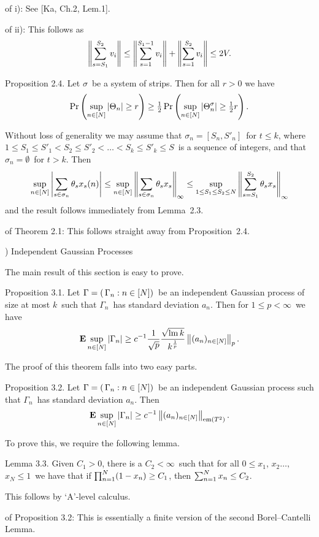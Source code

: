 \proof of i): See [Ka, Ch.2, Lem.1].
\endproof
 
\proof of ii): This follows as
$$ \left\|\sum_{s=S_1}^{S_2}v_i\right\|
\le \left\|\sum_{s=1}^{S_1-1}v_i\right\|
+ \left\|\sum_{s=1}^{S_2}v_i\right\|
\le 2V. $$
\endproof
 
\proclaim Proposition 2.4. Let $\sigma$\ be a system of strips. Then
for all $r>0$ we have
$$ \mathop{\rm Pr}\nolimits\left(\sup_{n\in[N]} \left| \Theta_n \right|\ge r\right)
   \ge {\textstyle {1\over2}}
   \mathop{\rm Pr}\nolimits\left(\sup_{n\in[N]} | \Theta^\sigma_n | \ge{\textstyle {1\over2}} r\right).$$
 
\Proof
Without loss of generality we may assume that
$ \sigma_n = [S_n,S'_n] $\ for $t\le k$,
where
$1\le S_1\le S'_1<S_2\le S'_2 <\ldots<S_k\le S'_k\le S $\
is a sequence of integers, and that $\sigma_n=\emptyset$\ for $t>k$.
Then
$$\sup_{n\in[N]}\left|\sum_{s\in\sigma_n}
\theta_s x_s(n)\right|
 \le \sup_{n\in[N]}\left\|\sum_{s\in\sigma_n} \theta_s x_s
\right\|_\infty
 \le \sup_{1\le S_1\le S_2\le N} \left\|\sum_{s=S_1}^{S_2}
\theta_s x_s \right\|_\infty $$
and the result follows immediately from Lemma~2.3.
\endproof
 
\bigskip
 
\proof of Theorem 2.1: This follows straight away from Proposition~2.4.
\endproof
 
\vfill
\eject
 
) Independent Gaussian Processes
 
The main result of this section is easy to prove.
 
\proclaim Proposition 3.1. Let $\Gamma=(\,\Gamma_n:n\in[N])$\ be an independent
Gaussian process of size at most $k$\ such that $\Gamma_n$\ has
standard deviation $a_n$. Then for $1\le p<\infty$\ we have
$$ {\bf E} \sup_{n\in[N]} | \Gamma_n | \ge c^{-1} {1\over\sqrt{p}} {\sqrt{\mathop{\rm lm}\nolimits k} \over k^{1\over p}}
   \left\| (a_n)_{n\in[N]} \right\|_p .$$
 
The proof of this theorem falls into two easy parts.
 
\proclaim Proposition 3.2. Let $\Gamma=(\,\Gamma_n:n\in[N])$\ be an independent
Gaussian process such that $\Gamma_n$\ has standard deviation $a_n$.
Then
$$ {\bf E} \sup_{n\in[N]} | \Gamma_n | \ge c^{-1} \left\| (a_n)_{n\in[N]} \right\|_{\mathop{\rm em}\nolimits(T^2)}.
$$
 
To prove this, we require the following lemma.
 
\proclaim Lemma 3.3. Given $C_1>0$, there is a $C_2<\infty$\ such
that for all
$0\le x_1$, $x_2\ldots,$\ $x_N \le 1$\ we have that
if $ \prod_{n=1}^N (1-x_n) \ge C_1$, then $ \sum_{n=1}^N x_n \le C_2$.
 
\Proof This follows by `A'-level calculus.
\endproof
 
\proof of Proposition 3.2: This is essentially a finite version of
the second
Borel--Cantelli Lemma.
 
